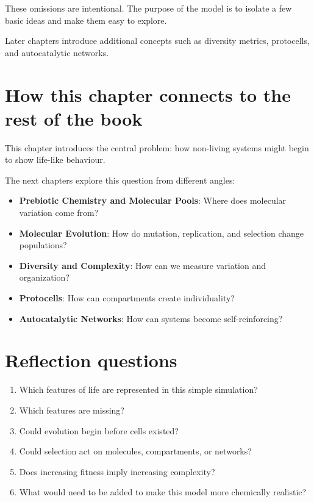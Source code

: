\documentclass[
  oneside,
  openany]{book}
\providecommand{\tightlist}{%
  \setlength{\itemsep}{0pt}\setlength{\parskip}{0pt}}
\begin{document}
These omissions are intentional. The purpose of the model is to isolate a few basic ideas and make them easy to explore.

Later chapters introduce additional concepts such as diversity metrics, protocells, and autocatalytic networks.

\section{How this chapter connects to the rest of the book}\label{how-this-chapter-connects-to-the-rest-of-the-book}

This chapter introduces the central problem: how non-living systems might begin to show life-like behaviour.

The next chapters explore this question from different angles:

\begin{itemize}
\tightlist
\item
  \textbf{Prebiotic Chemistry and Molecular Pools}: Where does molecular variation come from?
\item
  \textbf{Molecular Evolution}: How do mutation, replication, and selection change populations?
\item
  \textbf{Diversity and Complexity}: How can we measure variation and organization?
\item
  \textbf{Protocells}: How can compartments create individuality?
\item
  \textbf{Autocatalytic Networks}: How can systems become self-reinforcing?
\end{itemize}

\section{Reflection questions}\label{reflection-questions}

\begin{enumerate}
\def\labelenumi{\arabic{enumi}.}
\tightlist
\item
  Which features of life are represented in this simple simulation?
\item
  Which features are missing?
\item
  Could evolution begin before cells existed?
\item
  Could selection act on molecules, compartments, or networks?
\item
  Does increasing fitness imply increasing complexity?
\item
  What would need to be added to make this model more chemically realistic?
\end{enumerate}
\end{document}
